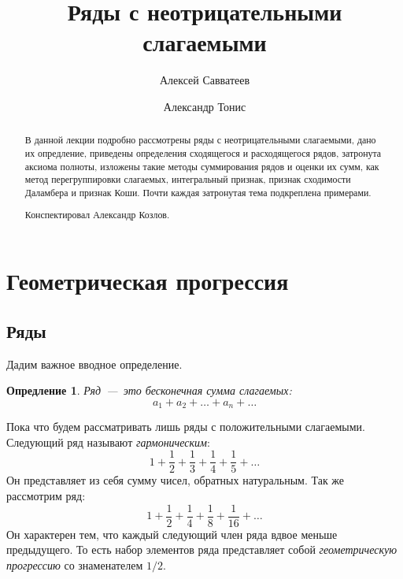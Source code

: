 \documentclass[12pt]{article}
\title{Ряды с неотрицательными слагаемыми}
\author{Алексей Савватеев \and Александр Тонис}
\newtheorem{definition}{Опредление}[section]
\begin{document}
\maketitle
\begin{abstract}
В данной лекции подробно рассмотрены ряды с неотрицательными слагаемыми, дано их опредление, приведены определения сходящегося и расходящегося рядов, затронута аксиома полноты, изложены такие методы суммирования рядов и оценки их сумм, как метод перегруппировки слагаемых, интегральный признак, признак сходимости Даламбера и признак Коши. Почти каждая затронутая тема подкреплена примерами.
\par
Конспектировал Александр Козлов. 
\end{abstract}
\newpage
\tableofcontents
\newpage
\section{Геометрическая прогрессия}
\subsection{Ряды}
Дадим важное вводное определение.
\begin{definition}
\emph{Ряд}~\----~это бесконечная сумма слагаемых:
\begin{equation}
    a_1 + a_2 + \ldots + a_n + \ldots
\end{equation}
\end{definition}
Пока что будем рассматривать лишь ряды с положительными слагаемыми. Следующий ряд называют \emph{гармоническим}:
\begin{equation}\label{eq:1}
    1 + \dfrac{1}{2} + \dfrac13 + \dfrac14 + \dfrac15 + \ldots
\end{equation}
Он представляет из себя сумму чисел, обратных натуральным. Так же рассмотрим ряд:
\begin{equation}\label{eq:2}
    1 + \dfrac{1}{2} + \dfrac14 + \dfrac18 + \dfrac{1}{16} + \ldots
\end{equation}
Он характерен тем, что каждый следующий член ряда вдвое меньше предыдущего. То есть набор элементов ряда представляет собой \emph{геометрическую прогрессию} со знаменателем $1/2$.
\end{document}

